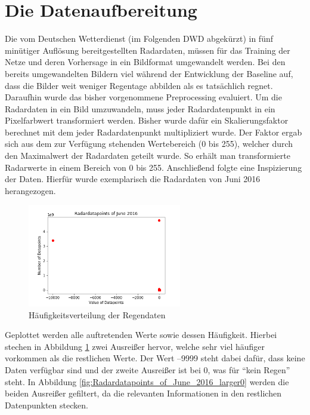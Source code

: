 \section{Die Datenaufbereitung}\label{die datenaufbereitung}
Die vom Deutschen Wetterdienst (im Folgenden DWD abgekürzt) in fünf minütiger Auflösung bereitgestellten Radardaten, müssen für das Training der Netze und deren Vorhersage in ein Bildformat umgewandelt werden.
Bei den bereits umgewandelten Bildern viel während der Entwicklung der Baseline auf, dass die Bilder weit weniger Regentage abbilden als es tatsächlich regnet. Daraufhin wurde das bisher vorgenommene Preprocessing evaluiert. Um die Radardaten in ein Bild umzuwandeln, muss jeder Radardatenpunkt in ein Pixelfarbwert transformiert werden. Bisher wurde dafür ein Skalierungsfaktor berechnet mit dem jeder Radardatenpunkt multipliziert wurde. Der Faktor ergab sich aus dem zur Verfügung stehenden Wertebereich (0 bis 255), welcher durch den Maximalwert der Radardaten geteilt wurde. So erhält man transformierte Radarwerte in einem Bereich von 0 bis 255.
Anschließend folgte eine Inspizierung der Daten. Hierfür wurde exemplarisch die Radardaten von Juni 2016 herangezogen.

\begin{figure}[H]
    \centering
    \includegraphics[width=0.6\textwidth,angle=0]{abb/Radardatapoints_of_June_2016}
    \caption[Datenaufbereitung]{Häufigkeitsverteilung der Regendaten}
    \label{fig:Radardatapoints_of_June_2016}
\end{figure}

Geplottet werden alle auftretenden Werte sowie dessen Häufigkeit. 
Hierbei stechen in Abbildung \ref{fig:Radardatapoints_of_June_2016} zwei Ausreißer hervor, welche sehr viel häufiger vorkommen als die restlichen Werte. 
Der Wert –9999 steht dabei dafür, dass keine Daten verfügbar sind und der zweite Ausreißer ist bei 0, was für “kein Regen” steht. 
In Abbildung \ref{fig:Radardatapoints_of_June_2016_larger0} werden die beiden Ausreißer gefiltert, da die relevanten Informationen in den restlichen Datenpunkten stecken.

